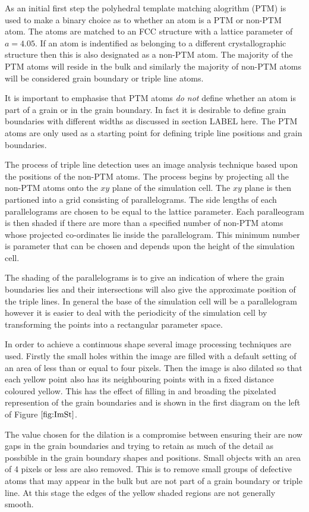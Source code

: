 \documentclass[12pt,a4paper]{book}
\begin{document}
As an initial first step the polyhedral template matching alogrithm (PTM) is used to make a binary choice as to whether an atom is a PTM or non-PTM atom. The atoms are matched to an FCC structure with a lattice parameter of $a=4.05$. If an atom is indentified as belonging to a different crystallographic structure then this is also designated as a non-PTM atom. The majority of the PTM atoms will reside in the bulk and similarly the majority of non-PTM atoms will be considered grain boundary or triple line atoms. 

It is important to emphasise that PTM atoms \emph{do not} define whether an atom is part of a grain or in the grain boundary. In fact it is desirable to define grain boundaries with different widths as discussed in section LABEL here. The PTM atoms are only used as a starting point for defining triple line positions and grain boundaries.

The process of triple line detection uses an image analysis technique based upon the positions of the non-PTM atoms. The process begins by projecting all the non-PTM atoms onto the $xy$ plane of the simulation cell. The $xy$ plane is then partioned into a grid consisting of parallelograms. The side lengths of each parallelograms are chosen to be equal to the lattice parameter. Each paralleogram is then shaded if there are more than a specified number of non-PTM atoms whose projected co-ordinates lie inside the parallelogram. This minimum number is parameter that can be chosen and depends upon the height of the simulation cell.

The shading of the parallelograms is to give an indication of where the grain boundaries lies and their intersections will also give the approximate position of the triple lines. In general the base of the simulation cell will be a parallelogram however it is easier to deal with the periodicity of the simulation cell by transforming the points into a rectangular parameter space. 

In order to achieve a continuous shape several image processing techniques are used. Firstly the small holes within the image are filled with a default setting of an area of less than or equal to four pixels. Then the image is also dilated so that each yellow point also has its neighbouring points with in a fixed distance coloured yellow. This has the effect of filling in and broading the pixelated represention of the grain boundaries and is shown in the first diagram on the left of Figure $\ref{fig:ImSt}$. 

The value chosen for the dilation is a compromise between ensuring their are now gaps in the grain boundaries and trying to retain as much of the detail as possbible in the grain boundary shapes and positions. Small objects with an area of 4 pixels or less are also removed. This is to remove small groups of defective atoms that may appear in the bulk but are not part of a grain boundary or triple line. At this stage the edges of the yellow shaded regions are not generally smooth.
\end{document}
